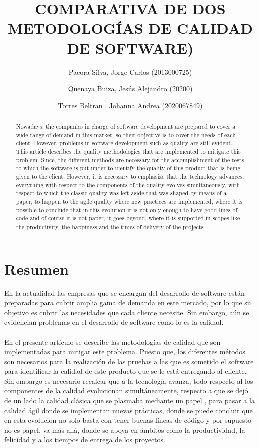 \documentclass[preprint,12pt]{elsarticle}
\begin{document}
	
	\begin{frontmatter}

		\title{\huge  COMPARATIVA DE DOS METODOLOGÍAS DE CALIDAD DE SOFTWARE) }
		\author{Pacora Silva, Jorge Carlos				(2013000725)}
		\author{Quenaya Buiza, Jesús Alejandro			(20200)}
		\author{Torres Beltran , Johanna Andrea			(2020067849)}
		\address{Tacna, Perú}
		


\begin{abstract}
Nowadays, the companies in charge of software development are prepared to cover a wide range of demand in this market, so their objective is to cover the needs of each client. However, problems in software development such as quality are still evident.
\\
This article describes the quality methodologies that are implemented to mitigate this problem. Since, the different methods are necessary for the accomplishment of the tests to which the software is put under to identify the quality of this product that is being given to the client.
However, it is necessary to emphasize that the technology advances, everything with respect to the components of the quality evolves simultaneously, with respect to which the classic quality was left aside that was shaped by means of a paper, to happen to the agile quality where new practices are implemented, where it is possible to conclude that in this evolution it is not only enough to have good lines of code and of course it is not paper, it goes beyond, where it is supported in scopes like the productivity, the happiness and the times of delivery of the projects.
\end{abstract}


\end{frontmatter}

\section{Resumen}
En la actualidad las empresas que se encargan del desarrollo de software están preparadas para cubrir amplia gama de demanda en este mercado, por lo que su  objetivo es cubrir las necesidades que cada cliente necesite. Sin embargo, aún se evidencian problemas en el desarrollo de software como lo es la calidad.
\\
\\
En el  presente artículo se describe las metodologías de calidad que son implementadas para mitigar este problema. Puesto que, los diferentes métodos  son necesarios para la realización de las  pruebas a las que es sometido el software para identificar la calidad de este producto que se le está entregando al cliente.
Sin embargo es necesario recalcar que a la tecnología avanza, todo respecto al los componentes de la calidad  evolucionan simultáneamente, respecto a que se dejó de un lado la calidad clásica que se plasmaba mediante un papel , para pasar a la calidad ágil donde se implementan nuevas prácticas, donde se puede concluir que en esta evolución no solo basta con tener buenas líneas de código y por supuesto no es papel, va más allá, donde se apoya en ámbitos como la productividad, la felicidad y a los tiempos de entrega de los proyectos.
\end{document}
